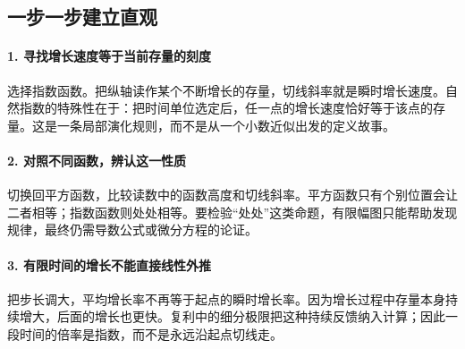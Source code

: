 \subsection*{一步一步建立直观}

\paragraph{1. 寻找增长速度等于当前存量的刻度}

选择指数函数。把纵轴读作某个不断增长的存量，切线斜率就是瞬时增长速度。自然指数的特殊性在于：把时间单位选定后，任一点的增长速度恰好等于该点的存量。这是一条局部演化规则，而不是从一个小数近似出发的定义故事。



\paragraph{2. 对照不同函数，辨认这一性质}

切换回平方函数，比较读数中的函数高度和切线斜率。平方函数只有个别位置会让二者相等；指数函数则处处相等。要检验“处处”这类命题，有限幅图只能帮助发现规律，最终仍需导数公式或微分方程的论证。



\paragraph{3. 有限时间的增长不能直接线性外推}

把步长调大，平均增长率不再等于起点的瞬时增长率。因为增长过程中存量本身持续增大，后面的增长也更快。复利中的细分极限把这种持续反馈纳入计算；因此一段时间的倍率是指数，而不是永远沿起点切线走。
